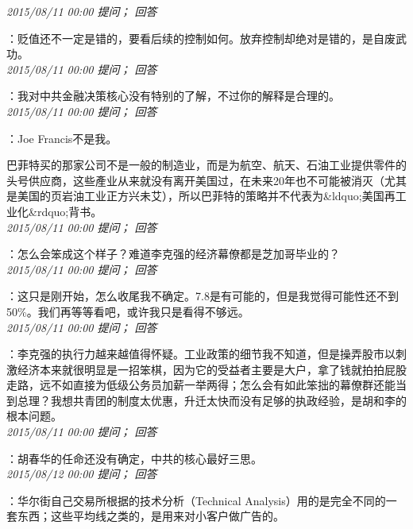 \documentclass[twocolumn]{ctexart}
\begin{document}
\textit{\hfill\noindent\small 2015/08/11 00:00 提问； 回答}

：贬值还不一定是错的，要看后续的控制如何。放弃控制却绝对是错的，是自废武功。\\

\textit{\hfill\noindent\small 2015/08/11 00:00 提问； 回答}

：我对中共金融决策核心没有特别的了解，不过你的解释是合理的。\\

\textit{\hfill\noindent\small 2015/08/11 00:00 提问； 回答}

：Joe Francis不是我。

巴菲特买的那家公司不是一般的制造业，而是为航空、航天、石油工业提供零件的头号供应商，这些產业从来就没有离开美国过，在未来20年也不可能被消灭（尤其是美国的页岩油工业正方兴未艾），所以巴菲特的策略并不代表为\&ldquo;美国再工业化\&rdquo;背书。\\

\textit{\hfill\noindent\small 2015/08/11 00:00 提问； 回答}

：怎么会笨成这个样子？难道李克强的经济幕僚都是芝加哥毕业的？\\

\textit{\hfill\noindent\small 2015/08/11 00:00 提问； 回答}

：这只是刚开始，怎么收尾我不确定。7.8是有可能的，但是我觉得可能性还不到50\%。我们再等等看吧，或许我只是看得不够远。\\

\textit{\hfill\noindent\small 2015/08/11 00:00 提问； 回答}

：李克强的执行力越来越值得怀疑。工业政策的细节我不知道，但是操弄股市以刺激经济本来就很明显是一招笨棋，因为它的受益者主要是大户，拿了钱就拍拍屁股走路，远不如直接为低级公务员加薪一举两得；怎么会有如此笨拙的幕僚群还能当到总理？我想共青团的制度太优惠，升迁太快而没有足够的执政经验，是胡和李的根本问题。\\

\textit{\hfill\noindent\small 2015/08/11 00:00 提问； 回答}

：胡春华的任命还没有确定，中共的核心最好三思。\\

\textit{\hfill\noindent\small 2015/08/12 00:00 提问； 回答}

：华尔街自己交易所根据的技术分析（Technical Analysis）用的是完全不同的一套东西；这些平均线之类的，是用来对小客户做广告的。\\
\end{document}
